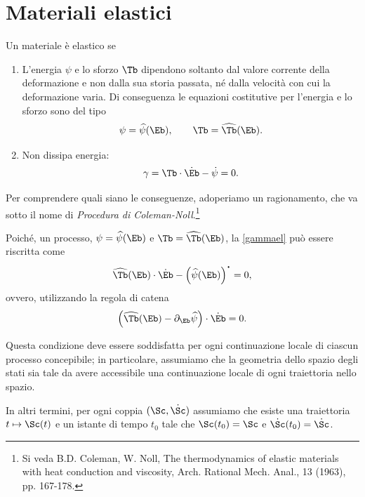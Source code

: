 \section{Materiali elastici}
Un materiale è elastico se
\begin{enumerate}
	\item  L'energia $\psi$ e lo sforzo $\Tb$ dipendono soltanto dal valore corrente della deformazione e non dalla sua storia passata, né dalla velocità con cui la deformazione varia. Di conseguenza le equazioni costitutive per l'energia e lo sforzo sono del tipo
	\begin{equation}\label{constel}
		\psi= \widehat{\psi}(\Eb), \qquad \Tb=\widehat{\Tb}(\Eb).
	\end{equation}
\item  Non dissipa energia:
\begin{equation}\label{gammael}
\gamma=	\Tb \cdot \dot \Eb-\dot{\psi}=0.
\end{equation}
\end{enumerate}


Per comprendere quali siano le conseguenze, adoperiamo un ragionamento, che va sotto il nome di \textit{Procedura di Coleman-Noll}.\footnote{Si veda B.D. Coleman,  W. Noll, The thermodynamics of elastic materials with heat conduction and viscosity, Arch. Rational Mech. Anal., 13 (1963), pp. 167-178.}

Poiché, un processo, $\psi=\widehat{\psi}(\Eb)$ e $\Tb=\widehat{\Tb}(\Eb)$, la \eqref{gammael} può essere riscritta come
\begin{equation}
	\widehat{\Tb}(\Eb)\cdot \dot{\Eb}-\Big(\widehat{\psi}(\Eb)\Big)^{\mathop{\vcenter{\hbox{\Large$\cdot$}}}}=0,
\end{equation}
ovvero, utilizzando la regola di catena
\begin{equation}\label{Tepsi}
	\Big( 	\widehat{\Tb}(\Eb)-\partial_\Eb\widehat{\psi} \Big)\cdot\dot{\Eb}=0.
\end{equation}

Questa condizione deve essere soddisfatta per ogni continuazione locale di ciascun processo concepibile; in particolare, assumiamo che la geometria dello spazio degli stati sia tale da avere accessibile una continuazione locale di ogni traiettoria nello spazio.

In altri termini, per ogni coppia $(\Sc, \dot{\Sc})$ assumiamo che esiste una traiettoria $t\mapsto\Sc(t)$ e un istante di tempo $t_0$ tale che $\Sc(t_0)=\Sc$ e $\dot{\Sc}(t_0)=\dot{\Sc}$. 

